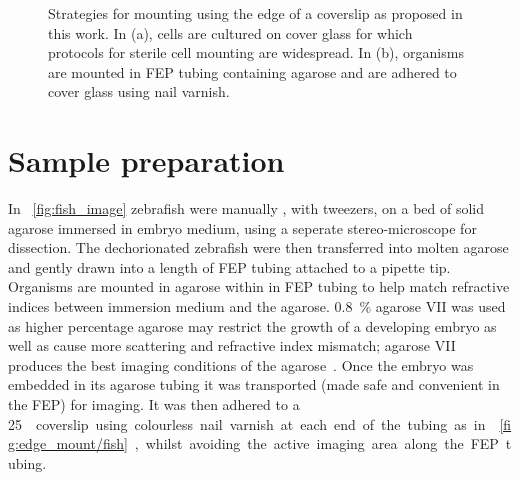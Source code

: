\begin{figure}
    \caption[Strategies for mounting using the edge of a coverslip]{Strategies for mounting using the edge of a coverslip as proposed in this work.
    In (a), cells are cultured on cover glass for which protocols for sterile cell mounting are widespread.
    In (b), organisms are mounted in \gls{FEP} tubing containing agarose and are adhered to cover glass using nail varnish.
    }\label{fig:edge_mount}
\end{figure}

\section{Sample preparation}

In \figurename~\ref{fig:fish_image} \gls{zebrafish} were manually , with tweezers, on a bed of solid agarose immersed in embryo medium, using a seperate stereo-microscope for dissection.
The dechorionated \gls{zebrafish} were then transferred into molten agarose and gently drawn into a length of \gls{FEP} tubing attached to a pipette tip.
Organisms are mounted in agarose within in \gls{FEP} tubing to help match refractive indices between immersion medium and the agarose.
\SI{0.8}{\percent} \gls{agarose VII} was used as higher percentage agarose may restrict the growth of a developing embryo as well as cause more scattering and refractive index mismatch; \gls{agarose VII} produces the best imaging conditions of the agarose~\cite{floodUsingHydrogelsMicroscopy2016}.
Once the embryo was embedded in its agarose tubing it was transported (made safe and convenient in the \gls{FEP}) for imaging.
It was then adhered to a \SI{25}{\milli\metre\square} coverslip using colourless nail varnish at each end of the tubing as in \figurename~\ref{fig:edge_mount/fish}, whilst avoiding the active imaging area along the \gls{FEP} tubing.

